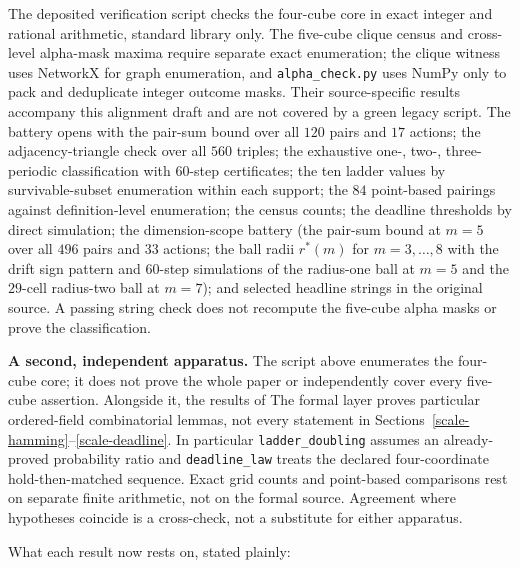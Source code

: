 \documentclass[10pt,twocolumn]{article}
\theoremstyle{plain}
\theoremstyle{definition}
\theoremstyle{remark}
\begin{document}
The deposited verification script checks the four-cube core in exact
integer and rational arithmetic, standard library only. The five-cube
clique census and cross-level alpha-mask maxima require separate exact
enumeration; the clique witness uses NetworkX for graph enumeration,
and \texttt{alpha\_check.py} uses NumPy only to pack and deduplicate
integer outcome masks. Their source-specific results accompany this
alignment draft and are not covered by a green legacy script. The battery opens with the pair-sum bound over all \(120\) pairs and \(17\) actions; the
adjacency-triangle check over all \(560\) triples; the exhaustive
one-, two-, three-periodic classification with \(60\)-step
certificates; the ten ladder values by survivable-subset enumeration
within each support; the \(84\) point-based pairings against
definition-level enumeration; the census counts; the deadline
thresholds by direct simulation; the dimension-scope battery (the
pair-sum bound at \(m = 5\) over all \(496\) pairs and \(33\)
actions; the ball radii \(r^{*}(m)\) for \(m = 3, \dots, 8\) with
the drift sign pattern and \(60\)-step simulations of the radius-one
ball at \(m = 5\) and the \(29\)-cell radius-two ball at
\(m = 7\)); and selected headline strings in the original source. A passing
string check does not recompute the five-cube alpha masks or prove the
classification.

\textbf{A second, independent apparatus.} The script above enumerates the four-cube core; it does not prove
the whole paper or independently cover every five-cube assertion. Alongside it, the results of
The formal layer proves particular ordered-field combinatorial
lemmas, not every statement in Sections~\ref{scale-hamming}--\ref{scale-deadline}.
In particular \texttt{ladder\_doubling} assumes an already-proved
probability ratio and \texttt{deadline\_law} treats the declared
four-coordinate hold-then-matched sequence. Exact grid counts and
point-based comparisons rest on separate finite arithmetic, not on
the formal source. Agreement where hypotheses coincide is a
cross-check, not a substitute for either apparatus.

What each result now rests on, stated plainly:
\end{document}
